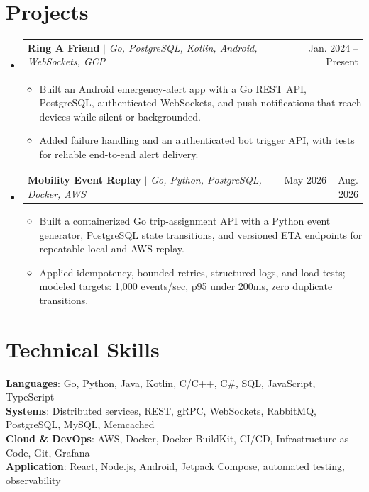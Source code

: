 \documentclass[letterpaper,11pt]{article}
\makeatletter
\newcommand{\resumeItem}[1]{
  \item\small{
    {#1 \vspace{-2pt}}
  }
}
\newcommand{\resumeProjectHeading}[2]{
    \item
    \begin{tabular*}{0.97\textwidth}{l@{\extracolsep{\fill}}r}
      \small#1 & #2 \\
    \end{tabular*}\vspace{-7pt}
}
\newcommand{\resumeSubHeadingListStart}{\begin{itemize}[leftmargin=0.15in, label={}]}
\newcommand{\resumeSubHeadingListEnd}{\end{itemize}}
\newcommand{\resumeItemListStart}{\begin{itemize}}
\newcommand{\resumeItemListEnd}{\end{itemize}\vspace{-5pt}}
\makeatother
\begin{document}
\section{Projects}
\resumeSubHeadingListStart
\resumeProjectHeading
{\textbf{Ring A Friend} $|$ \emph{Go, PostgreSQL, Kotlin, Android, WebSockets, GCP}}{Jan. 2024 -- Present}
\resumeItemListStart
\resumeItem{Built an Android emergency-alert app with a Go REST API, PostgreSQL, authenticated WebSockets, and push notifications that reach devices while silent or backgrounded.}
\resumeItem{Added failure handling and an authenticated bot trigger API, with tests for reliable end-to-end alert delivery.}
\resumeItemListEnd
\resumeProjectHeading
{\textbf{Mobility Event Replay} $|$ \emph{Go, Python, PostgreSQL, Docker, AWS}}{May 2026 -- Aug. 2026}
\resumeItemListStart
\resumeItem{Built a containerized Go trip-assignment API with a Python event generator, PostgreSQL state transitions, and versioned ETA endpoints for repeatable local and AWS replay.}
\resumeItem{Applied idempotency, bounded retries, structured logs, and load tests; modeled targets: 1,000 events/sec, p95 under 200ms, zero duplicate transitions.}
\resumeItemListEnd
\resumeSubHeadingListEnd



%
\section{Technical Skills}
\begin{itemize}[leftmargin=0.15in, label={}]
  \small{\item{
        \textbf{Languages}{: Go, Python, Java, Kotlin, C/C++, C\#, SQL, JavaScript, TypeScript} \\
        \textbf{Systems}{: Distributed services, REST, gRPC, WebSockets, RabbitMQ, PostgreSQL, MySQL, Memcached} \\
        \textbf{Cloud \& DevOps}{: AWS, Docker, Docker BuildKit, CI/CD, Infrastructure as Code, Git, Grafana} \\
        \textbf{Application}{: React, Node.js, Android, Jetpack Compose, automated testing, observability}
        }}
\end{itemize}


\end{document}
